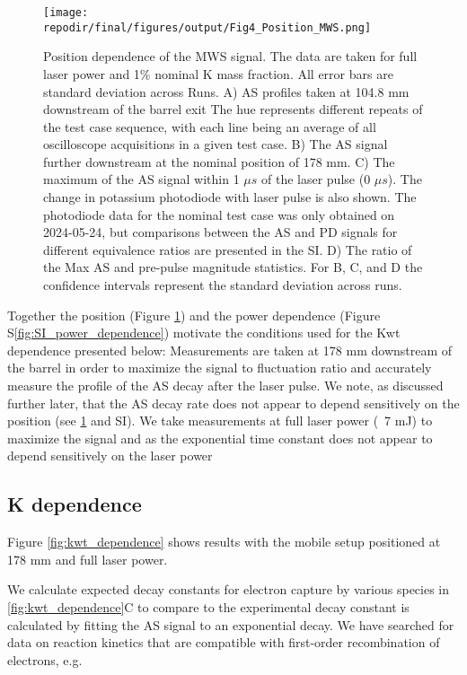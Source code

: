 \begin{figure}[h]
    \texttt{[image: \\repodir/final/figures/output/Fig4\_Position\_MWS.png]} 
    \caption{Position dependence of the MWS signal. The data are taken for full laser power and 1\% nominal K mass fraction. All error bars are standard deviation across Runs. A) AS profiles taken at 104.8 mm downstream of the barrel exit The hue represents different repeats of the test case sequence, with each line being an average of all oscilloscope acquisitions in a given test case.  B) The AS signal further downstream at the nominal position of 178 mm. C)  The maximum of the AS signal within 1 $\mu s$ of the laser pulse (0 $\mu s$). The change in potassium photodiode with laser pulse is also shown. The photodiode data for the nominal test case was only obtained on 2024-05-24, but comparisons between the AS and PD signals for different equivalence ratios are presented in the SI. D) The ratio of the Max AS and pre-pulse magnitude statistics. For B, C, and D the confidence intervals represent the standard deviation across runs. } 
    \label{fig:pos_dependence_mws}
\end{figure}





Together the position (Figure \ref{fig:pos_dependence_mws}) and the power dependence (Figure S\ref*{fig:SI_power_dependence}) motivate the conditions used for the Kwt dependence presented below: Measurements are taken at 178 mm downstream of the barrel in order to maximize the signal to fluctuation ratio and accurately measure the profile of the AS decay after the laser pulse. We note, as discussed further later, that the AS decay rate does not appear to depend sensitively on the position (see \ref{fig:pos_dependence_mws} and SI). We take measurements at full laser power (~7 mJ) to maximize the signal and as the exponential time constant does not appear to depend sensitively on the laser power

\clearpage

\subsection{K dependence}

Figure \ref{fig:kwt_dependence} shows results with the mobile setup positioned at 178 mm and full laser power. 

We calculate expected decay constants for electron capture by various species in \ref{fig:kwt_dependence}C to compare to the experimental decay constant is calculated by fitting the AS signal to an exponential decay. We have searched for data on reaction kinetics that are compatible with first-order recombination of electrons, e.g.

